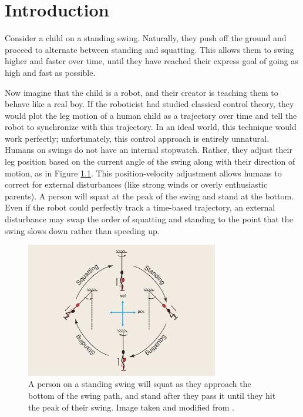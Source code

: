 

\chapter{Introduction}
Consider a child on a standing swing.
Naturally, they push off the ground and proceed to alternate between standing
and squatting. 
This allows them to swing higher and faster over time, until they have reached
their express goal of going as high and fast as possible.

Now imagine that the child is a robot, and their creator is teaching them to
behave like a real boy.
If the roboticist had studied classical control theory, they would plot the leg
motion of a human child as a trajectory over time and tell the robot to
synchronize with this trajectory.
In an ideal world, this technique would work perfectly; unfortunately, this
control approach is entirely unnatural. 
Humans on swings do not have an internal stopwatch.
Rather, they adjust their leg position based on the current angle of the swing
along with their direction of motion, as in Figure \ref{fig:swing-pos-vel}.
This position-velocity adjustment allows humans to correct for external
disturbances (like strong winds or overly enthusiastic parents).
A person will squat at the peak of the swing and stand at the bottom.
Even if the robot could perfectly track a time-based trajectory, an external
disturbance may swap the order of squatting and standing to the point that
the swing slows down rather than speeding up.

\begin{figure}
    \centering
    \includegraphics[width=0.75\textwidth]{images/swing_pos_vel.png}
    \caption{A person on a standing swing will squat as they approach the
        bottom of the swing path, and stand after they pass it until they hit
        the peak of their swing. Image taken and modified from
    \cite{pumping_swing_standing_squatting}.}
    \label{fig:swing-pos-vel}
\end{figure}

